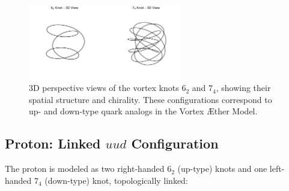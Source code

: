 \documentclass[12pt]{article}
\begin{document}
\begin{figure}[H]
    \centering
    \includegraphics[width=0.6\textwidth]{images/knots_6_2_and_7_4_3D}
    \caption{3D perspective views of the vortex knots \(6_2\) and \(7_4\), showing their spatial structure and chirality. These configurations correspond to up- and down-type quark analogs in the Vortex \AE ther Model.}
\end{figure}


\subsection{Proton: Linked \(uud\) Configuration}

The proton is modeled as two right-handed \( 6_2 \) (up-type) knots and one left-handed \( 7_4 \) (down-type) knot, topologically linked:
\end{document}
